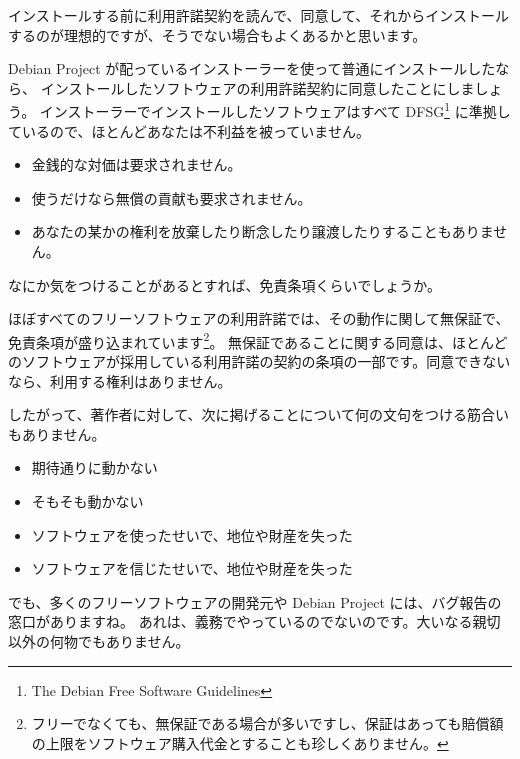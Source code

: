 \documentclass[mingoth,a4paper]{jsarticle}
\begin{document}
インストールする前に利用許諾契約を読んで、同意して、それからインストールするのが理想的ですが、そうでない場合もよくあるかと思います。

Debian Project が配っているインストーラーを使って普通にインストールしたなら、
インストールしたソフトウェアの利用許諾契約に同意したことにしましょう。
インストーラーでインストールしたソフトウェアはすべて DFSG\footnote{The Debian Free Software Guidelines\cite{DFSG}} に準拠しているので、ほとんどあなたは不利益を被っていません。

\begin{itemize}
\item 金銭的な対価は要求されません。
\item 使うだけなら無償の貢献も要求されません。
\item あなたの某かの権利を放棄したり断念したり譲渡したりすることもありません。
\end{itemize}

なにか気をつけることがあるとすれば、免責条項くらいでしょうか。

 ほぼすべてのフリーソフトウェアの利用許諾では、その動作に関して無保証で、免責条項が盛り込まれています\footnote{フリーでなくても、無保証である場合が多いですし、保証はあっても賠償額の上限をソフトウェア購入代金とすることも珍しくありません。}。
無保証であることに関する同意は、ほとんどのソフトウェアが採用している利用許諾の契約の条項の一部です。同意できないなら、利用する権利はありません。

したがって、著作者に対して、次に掲げることについて何の文句をつける筋合いもありません。
\begin{itemize}
\item  期待通りに動かない
\item  そもそも動かない
\item  ソフトウェアを使ったせいで、地位や財産を失った
\item  ソフトウェアを信じたせいで、地位や財産を失った
\end{itemize}

でも、多くのフリーソフトウェアの開発元や Debian Project には、バグ報告の窓口がありますね。
あれは、義務でやっているのでないのです。大いなる親切以外の何物でもありません。


\end{document}
